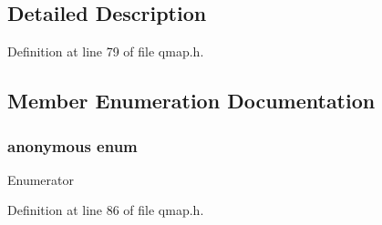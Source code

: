\subsection{Detailed Description}


Definition at line 79 of file qmap.\+h.



\subsection{Member Enumeration Documentation}
\subsubsection[{\texorpdfstring{anonymous enum}{anonymous enum}}]{\setlength{\rightskip}{0pt plus 5cm}anonymous enum}\hypertarget{struct_q_map_node_base_a98cd178a8587938441e879d638d4576c}{}\label{struct_q_map_node_base_a98cd178a8587938441e879d638d4576c}
\begin{Desc}
\item[Enumerator]\par
\begin{description}
\item[{\em 
Mask\hypertarget{struct_q_map_node_base_a98cd178a8587938441e879d638d4576cac454825c84685bfcd5173ffa84b23eb1}{}\label{struct_q_map_node_base_a98cd178a8587938441e879d638d4576cac454825c84685bfcd5173ffa84b23eb1}
}]\end{description}
\end{Desc}


Definition at line 86 of file qmap.\+h.

